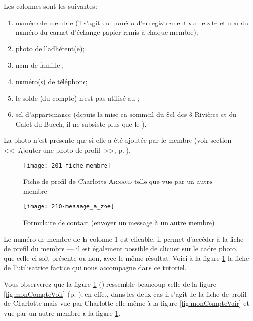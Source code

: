 Les colonnes sont les suivantes: 
\begin{enumerate}
    \item {}numéro de membre (il s’agit du numéro d’enregistrement sur le site et non du numéro du carnet d’échange papier remis à chaque membre);
    \item photo de l’adhérent(e);
    \item nom de famille\,;
    \item numéro(s) de téléphone;
    \item le solde (du compte) n’est pas utilisé au \CdS;
    \item sel d’appartenance (depuis la mise en sommeil du Sel des 3 Rivières et du Galet du Buech, il ne subsiste plus que le \CdS).
\end{enumerate}
La photo n'est présente que si elle a été ajoutée par le membre (voir section <<~Ajouter une photo de profil~>>, p. \pageref{sec:insererImage}).


\label{sec:ficheProfil}

\begin{figure}
    \centering
    \texttt{[image: 201-fiche\_membre]}
    \caption[Fiche de profil de Charlotte \textsc{Arnaud}]{Fiche de profil de Charlotte \textsc{Arnaud} telle que vue par un autre membre}
    \label{fig:ficheMembre}
\end{figure}
\begin{figure}
    \centering
    \texttt{[image: 210-message\_a\_zoe]}
    \caption[Formulaire de contact]{Formulaire de contact (envoyer un message à un autre membre)}
    \label{fig:envoiMessage}
\end{figure}
Le numéro de membre de la colonne 1 est clicable, il permet d’accéder à la fiche de profil du membre --- il est également possible de cliquer sur le cadre photo, que celle-ci soit présente ou non, avec le même résultat. Voici à la figure \ref{fig:ficheMembre} la fiche de l'utilisatrice factice qui nous accompagne dans ce tutoriel.

Vous observerez que la figure \ref{fig:ficheMembre} () ressemble beaucoup celle de la figure \ref{fig:monCompteVoir} (p. \pageref{fig:monCompteVoir}); en effet, dans les deux cas il s'agit de la fiche de profil de Charlotte mais vue par Charlotte elle-même à la figure \ref{fig:monCompteVoir} et vue par un autre membre à la figure \ref{fig:ficheMembre}.

